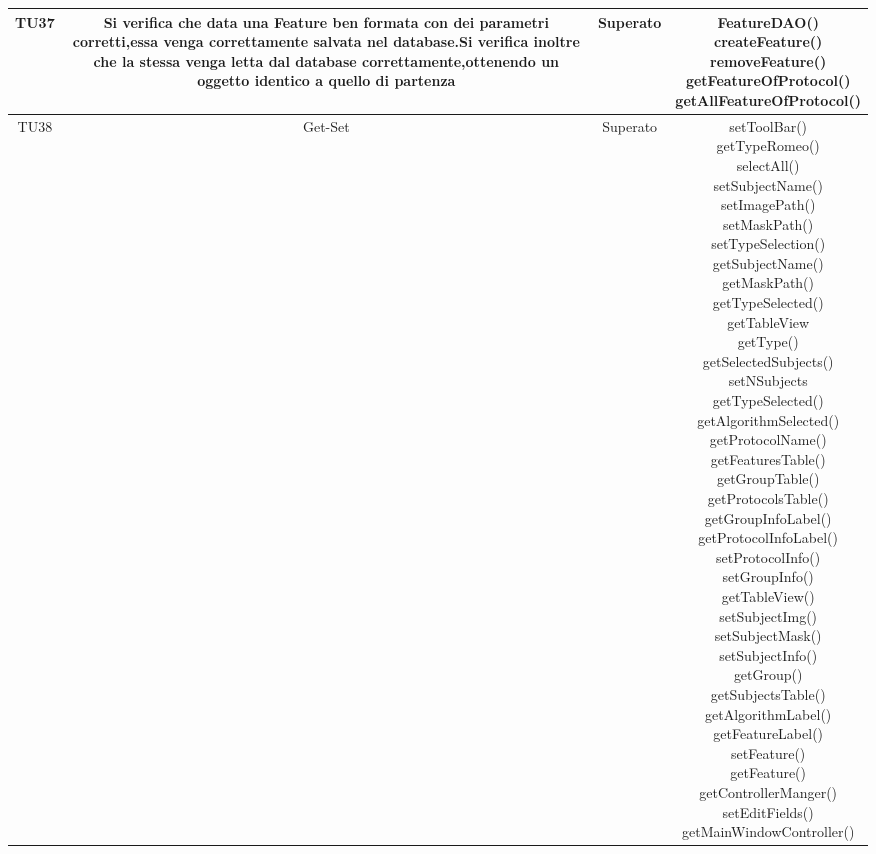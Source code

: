 \begin{center}
\begin{longtable}{|c|c|c|c|}
\hline
TU37 & \parbox[t]{\larghezza}{ Si verifica che data una Feature ben formata con dei parametri corretti,essa venga correttamente salvata nel database.Si verifica inoltre che la stessa venga letta dal database correttamente,ottenendo un oggetto identico a quello di partenza } & Superato & \parbox[t]{\dimTipo} { FeatureDAO() \\ createFeature() \\ removeFeature() \\ getFeatureOfProtocol() \\ getAllFeatureOfProtocol() \\ } \\
\hline
TU38 & \parbox[t]{\larghezza}{ Get-Set } & Superato & \parbox[t]{\dimTipo} { setToolBar() \\ getTypeRomeo() \\ selectAll() \\ setSubjectName() \\ setImagePath() \\ setMaskPath() \\ setTypeSelection() \\ getSubjectName() \\ getMaskPath() \\ getTypeSelected() \\ getTableView \\ getType() \\ getSelectedSubjects() \\ setNSubjects \\ getTypeSelected() \\ getAlgorithmSelected() \\ getProtocolName() \\ getFeaturesTable() \\ getGroupTable() \\ getProtocolsTable() \\ getGroupInfoLabel() \\ getProtocolInfoLabel() \\ setProtocolInfo() \\ setGroupInfo() \\ getTableView() \\ setSubjectImg() \\ setSubjectMask() \\ setSubjectInfo() \\ getGroup() \\ getSubjectsTable() \\ getAlgorithmLabel() \\ getFeatureLabel() \\ setFeature() \\ getFeature() \\ getControllerManger() \\ setEditFields() \\ getMainWindowController() \\ } \\

\end{longtable}
\end{center}
